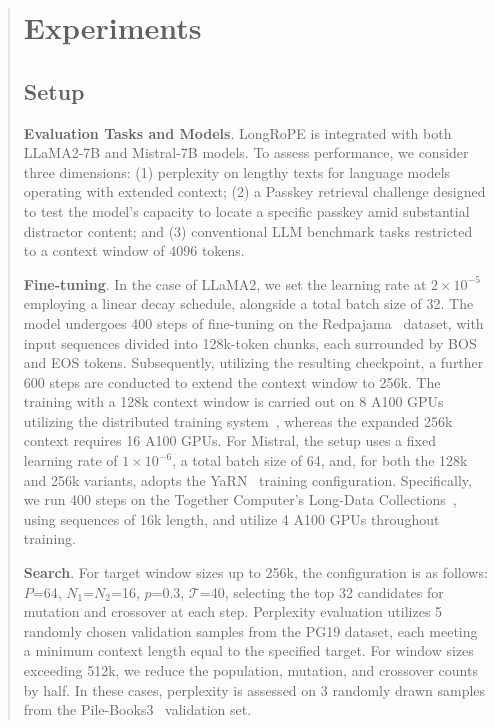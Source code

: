 \begin{abstract}
 \section{Experiments}

\label{sec:exp}
\subsection{Setup}
\textbf{Evaluation Tasks and Models}. LongRoPE is integrated with both LLaMA2-7B and Mistral-7B models. To assess performance, we consider three dimensions: (1) perplexity on lengthy texts for language models operating with extended context; (2) a Passkey retrieval challenge designed to test the model's capacity to locate a specific passkey amid substantial distractor content; and (3) conventional LLM benchmark tasks restricted to a context window of 4096 tokens.

\textbf{Fine-tuning}. In the case of LLaMA2, we set the learning rate at $2\times 10^{-5}$ employing a linear decay schedule, alongside a total batch size of 32. The model undergoes 400 steps of fine-tuning on the Redpajama~\cite{redpajama} dataset, with input sequences divided into 128k-token chunks, each surrounded by BOS and EOS tokens. Subsequently, utilizing the resulting checkpoint, a further 600 steps are conducted to extend the context window to 256k. The training with a 128k context window is carried out on 8 A100 GPUs utilizing the distributed training system~\cite{cube}, whereas the expanded 256k context requires 16 A100 GPUs. For Mistral, the setup uses a fixed learning rate of $1\times 10^{-6}$, a total batch size of 64, and, for both the 128k and 256k variants, adopts the YaRN~\cite{yarn} training configuration. Specifically, we run 400 steps on the Together Computer's Long-Data Collections~\cite{mistraldata}, using sequences of 16k length, and utilize 4 A100 GPUs throughout training.

\textbf{Search}. For target window sizes up to 256k, the configuration is as follows: $P$=64, $N_1$=$N_2$=16, $p$=0.3, $\mathcal{T}$=40, selecting the top 32 candidates for mutation and crossover at each step. Perplexity evaluation utilizes 5 randomly chosen validation samples from the PG19 dataset, each meeting a minimum context length equal to the specified target. For window sizes exceeding 512k, we reduce the population, mutation, and crossover counts by half. In these cases, perplexity is assessed on 3 randomly drawn samples from the Pile-Books3~\cite{pile} validation set.


\end{abstract}
